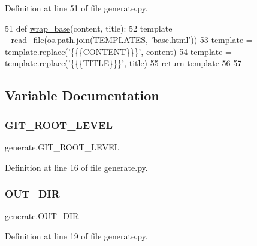 Definition at line 51 of file generate.\+py.


\begin{DoxyCode}
51 \textcolor{keyword}{def }\hyperlink{namespacegenerate_adb990cdb948e21150b35af85d236b6be}{wrap\_base}(content, title):
52     template = \_read\_file(os.path.join(TEMPLATES, \textcolor{stringliteral}{'base.html'}))
53     template = template.replace(\textcolor{stringliteral}{'\{\{\{CONTENT\}\}\}'}, content)
54     template = template.replace(\textcolor{stringliteral}{'\{\{\{TITLE\}\}\}'}, title)
55     \textcolor{keywordflow}{return} template
56 
57 
\end{DoxyCode}


\subsection{Variable Documentation}
\mbox{\label{namespacegenerate_afea39d363835652697e0616074816686}} 
\subsubsection{\texorpdfstring{G\+I\+T\+\_\+\+R\+O\+O\+T\+\_\+\+L\+E\+V\+EL}{GIT\_ROOT\_LEVEL}}
{\footnotesize\ttfamily generate.\+G\+I\+T\+\_\+\+R\+O\+O\+T\+\_\+\+L\+E\+V\+EL}



Definition at line 16 of file generate.\+py.

\mbox{\label{namespacegenerate_a6883b4bdece5baaaaf8a166563dd789e}} 
\subsubsection{\texorpdfstring{O\+U\+T\+\_\+\+D\+IR}{OUT\_DIR}}
{\footnotesize\ttfamily generate.\+O\+U\+T\+\_\+\+D\+IR}



Definition at line 19 of file generate.\+py.

\mbox{\label{namespacegenerate_ae98641ac5f9b63366f1c9b644d0a7548}} 
